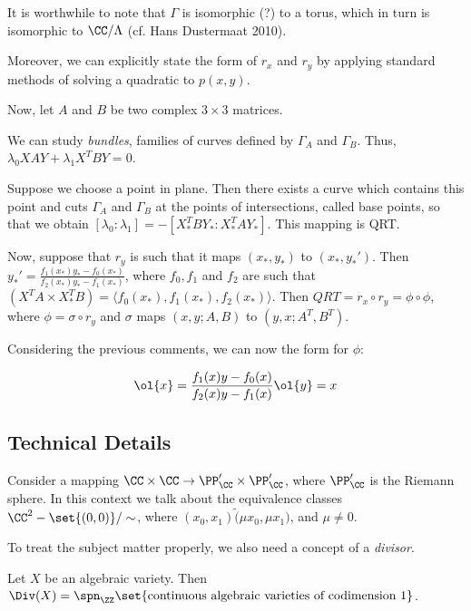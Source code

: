 \documentclass[11pt]{scrartcl}
\begin{document}
  It is worthwhile to note that $\Gamma$ is isomorphic (?) to a torus,
  which in turn is isomorphic to $\CC / \Lambda$ (cf. Hans Dustermaat
  2010).

  Moreover, we can explicitly state the form of $r_{x}$ and $r_{y}$
  by applying standard methods of solving a quadratic to $p(x, y)$.

  Now, let $A$ and $B$ be two complex $3\times 3$ matrices.

  We can study \textit{bundles}, families of curves defined by
  $\Gamma_{A}$ and $\Gamma_{B}$. Thus,
  $\lambda_{0}XAY + \lambda_{1}X^{T}BY = 0$.

  Suppose we choose a point in plane. Then there exists a curve which
  contains this point and cuts $\Gamma_{A}$ and $\Gamma_{B}$ at the
  points of intersections, called base points, so that we obtain
  $[\lambda_{0}: \lambda_{1}] = -[X_{*}^{T}BY_{*}:X_{*}^{T}AY_{*}]$.
  This mapping is QRT.

  Now, suppose that $r_{y}$ is such that it maps $(x_{*}, y_{*})$ to
  $(x_{*}, y_{*}')$. Then
  $y_{*}' = \frac{f_{1}(x_{*}) y_{*} -
    f_{0}(x_{*})}{f_{2}(x_{*})y_{*}-f_{1}(x_{*})}$, where
  $f_{0}, f_{1}$ and $f_{2}$ are such that
  $(X^{T}A\times X_{*}^{T}B) = \langle f_{0}(x_{*}), f_{1}(x_{*}),
    f_{2}(x_{*})\rangle$. Then $QRT = r_{x} \circ r_{y} = \phi \circ \phi$,
  where $\phi = \sigma \circ r_{y}$ and $\sigma$ maps $(x, y; A, B)$
  to $(y,x; A^{T}, B^{T})$.

  Considering the previous comments, we can now the form for $\phi$:

  \begin{equation}
    \ol{x}  = \frac{f_{1}(x)y-f_{0}(x)}{f_{2}(x)y - f_{1}(x)}\\
    \ol{y}= x
  \end{equation}

  \subsection{Technical Details}

  Consider a mapping $\CC\times \CC \to \PP_{\CC}'\times \PP_{\CC}'$,
  where $\PP_{\CC}'$ is the Riemann sphere. In this context we talk
  about the equivalence classes $\CC^{2} - \set{(0, 0)} / \sim$,
  where $(x_{0}, x_{1}) \tilde (\mu x_{0}, \mu x_{1})$, and
  $\mu \neq 0$.

  To treat the subject matter properly, we also need a concept of a
  \textit{divisor}.

  Let $X$ be an algebraic variety. Then
  $\Div(X) = \spn_{\ZZ}\set{\text{continuous algebraic varieties of
      codimension 1}}$.
\end{document}
